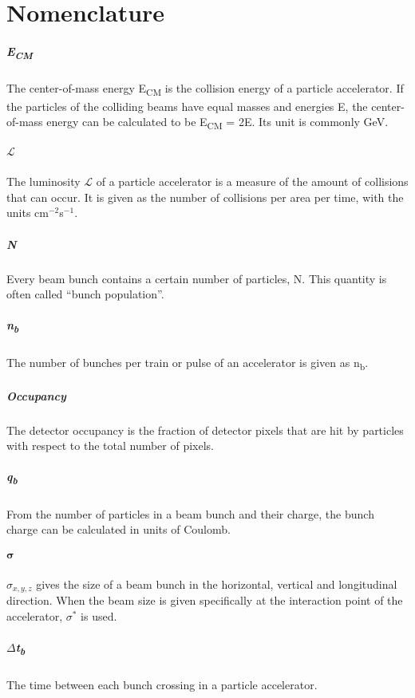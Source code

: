 \chapter*{Nomenclature} 
\paragraph{E\textsubscript{CM}}
The center-of-mass energy E\textsubscript{CM} is the collision energy of a particle accelerator.
If the particles of the colliding beams have equal masses and energies E, the center-of-mass energy can be calculated to be E\textsubscript{CM} = 2E. Its unit is commonly GeV.
\paragraph{$\bm{\mathcal{L}}$}
The luminosity $\mathcal{L}$ of a particle accelerator is a measure of the amount of collisions that can occur. It is given as the number of collisions per area per time, with the units cm$^{-2}$s$^{-1}$.
\paragraph{N}
Every beam bunch contains a certain number of particles, N. This quantity is often called ``bunch population''.
\paragraph{n\textsubscript{b}}
The number of bunches per train or pulse of an accelerator is given as n\textsubscript{b}.
\paragraph{Occupancy}
The detector occupancy is the fraction of detector pixels that are hit by particles with respect to the total number of pixels.
\paragraph{q\textsubscript{b}}
From the number of particles in a beam bunch and their charge, the bunch charge can be calculated in units of Coulomb.
\paragraph{$\bm\sigma$}
$\sigma_{x,y,z}$ gives the size of a beam bunch in the horizontal, vertical and longitudinal direction. When the beam size is given specifically at the interaction point of the accelerator, $\sigma^*$ is used.
\paragraph{$\Delta$t\textsubscript{b}}
The time between each bunch crossing in a particle accelerator.